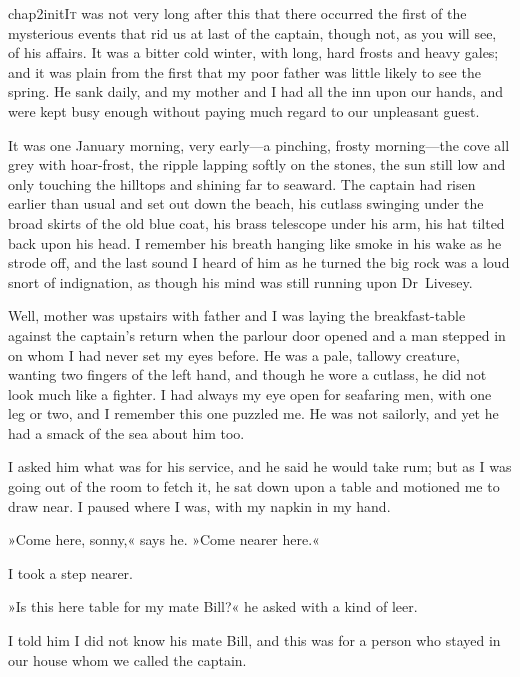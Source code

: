

\lettrine[lines=5,image=true,findent=2pt]{chap2initI}{t} was not very long after this that there occurred the first of the mysterious events that rid us at last of the captain, though not, as you will see, of his affairs. It was a bitter cold winter, with long, hard frosts and heavy gales; and it was plain from the first that my poor father was little likely to see the spring. He sank daily, and my mother and I had all the inn upon our hands, and were kept busy enough without paying much regard to our unpleasant guest.

It was one January morning, very early—a pinching, frosty morning—the cove all grey with hoar-frost, the ripple lapping softly on the stones, the sun still low and only touching the hilltops and shining far to seaward. The captain had risen earlier than usual and set out down the beach, his cutlass swinging under the broad skirts of the old blue coat, his brass telescope under his arm, his hat tilted back upon his head. I remember his breath hanging like smoke in his wake as he strode off, and the last sound I heard of him as he turned the big rock was a loud snort of indignation, as though his mind was still running upon Dr~Livesey.

Well, mother was upstairs with father and I was laying the breakfast-table against the captain's return when the parlour door opened and a man stepped in on whom I had never set my eyes before. He was a pale, tallowy creature, wanting two fingers of the left hand, and though he wore a cutlass, he did not look much like a fighter. I had always my eye open for seafaring men, with one leg or two, and I remember this one puzzled me. He was not sailorly, and yet he had a smack of the sea about him too.

I asked him what was for his service, and he said he would take rum; but as I was going out of the room to fetch it, he sat down upon a table and motioned me to draw near. I paused where I was, with my napkin in my hand.

»Come here, sonny,« says he. »Come nearer here.«

I took a step nearer.

»Is this here table for my mate Bill?« he asked with a kind of leer.

I told him I did not know his mate Bill, and this was for a person who stayed in our house whom we called the captain.

